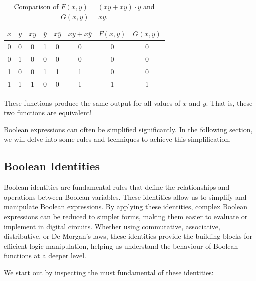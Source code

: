 \begin{table}[h!]
\begin{center}
\renewcommand{\arraystretch}{1.5} %
\begin{tabular}{c|c|c|c|c|c|c|c}
$x$ & $y$ & $xy$ & $\overline{y}$ & $x\overline{y}$ & $xy + x\overline{y}$ & $F(x, y)$ & $G(x, y)$ \\
\hline
0 & 0 & 0 & 1 & 0 & 0 & 0 & 0 \\
\rowcolor{gray!20}
0 & 1 & 0 & 0 & 0 & 0 & 0 & 0 \\
1 & 0 & 0 & 1 & 1 & 1 & 0 & 0 \\
\rowcolor{gray!20}
1 & 1 & 1 & 0 & 0 & 1 & 1 & 1 \\

\end{tabular}
\end{center}
\caption{Comparison of \( F(x, y) = (x\overline{y} + xy) \cdot y \) and \( G(x, y) = xy \).}
\label{tab:simplifying_boolean}
\end{table}

These functions produce the same output for all values of \( x \) and \( y \). That is, these two functions are equivalent!

Boolean expressions can often be simplified significantly. In the following section, we will delve into some rules and techniques to achieve this simplification.

\subsection*{Boolean Identities}
Boolean identities are fundamental rules that define the relationships and operations between Boolean variables. These identities allow us to simplify and manipulate Boolean expressions. By applying these identities, complex Boolean expressions can be reduced to simpler forms, making them easier to evaluate or implement in digital circuits. Whether using commutative, associative, distributive, or De Morgan's laws, these identities provide the building blocks for efficient logic manipulation, helping us understand the behaviour of Boolean functions at a deeper level.

We start out by inspecting the must fundamental of these identities:

